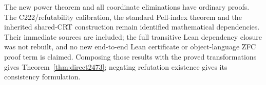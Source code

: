 The new power theorem and all coordinate eliminations have ordinary
proofs. The C222/refutability calibration, the standard Pell-index
theorem and the inherited shared-CRT construction remain identified
mathematical dependencies. Their immediate sources are included; the
full transitive Lean dependency closure was not rebuilt, and no new
end-to-end Lean certificate or object-language ZFC proof term is
claimed. Composing those results with the proved transformations gives
Theorem~\ref{thm:direct2473}; negating refutation existence gives its
consistency formulation.
